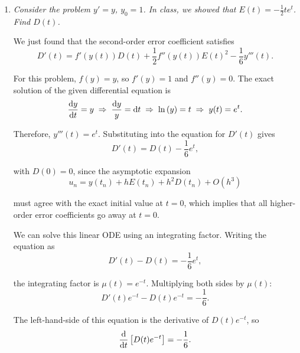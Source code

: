 \begin{enumerate}[label=(\alph*)]
    \item \textit{Consider the problem $y'=y$, $y_{0}=1$. In class, we showed that $E(t)=-\frac{1}{2}te^{t}$. Find $D(t)$.}
      \vspace{1em}

      We just found that the second-order error coefficient satisfies
      \begin{equation*}
          D'(t) = f'(y(t))D(t) + \frac{1}{2} f''(y(t))E(t)^{2} - \frac{1}{6}y'''(t).
      \end{equation*}

      For this problem, $f(y)=y$, so $f'(y)=1$ and $f''(y)=0$. The exact solution of the given differential equation is
      \begin{equation*}
        \dv{y}{t} = y \;\Rightarrow\; \frac{\mathrm{d}y}{y} = \mathrm{d}t \;\Rightarrow\; \ln{(y)} = t \;\Rightarrow\; y(t) = e^{t}.
      \end{equation*}

      Therefore, $y'''(t) = e^{t}$. Substituting into the equation for $D'(t)$ gives
      \begin{equation*}
          D'(t) = D(t)-\frac{1}{6}e^{t},
      \end{equation*}

      with $D(0)=0$, since the asymptotic expansion
      \begin{equation*}
          u_n = y(t_n) + h E(t_n) + h^2 D(t_n) + O(h^3)
      \end{equation*}

      must agree with the exact initial value at $t=0$, which implies that all higher-order error coefficients go away at $t=0$.
      \vspace{1em}

      We can solve this linear ODE using an integrating factor. Writing the equation as
      \begin{equation*}
          D'(t) - D(t) = -\frac{1}{6}e^{t},
      \end{equation*}

      the integrating factor is $\mu(t) = e^{-t}$. Multiplying both sides by $\mu(t)$:
      \begin{equation*}
        D'(t)e^{-t} - D(t)e^{-t} = -\frac{1}{6}.
      \end{equation*}

      The left-hand-side of this equation is the derivative of $D(t)e^{-t}$, so
      \begin{equation*}
        \dv{t}\left[D(t)e^{-t}\right] = -\frac{1}{6}.
      \end{equation*}


\end{enumerate}
